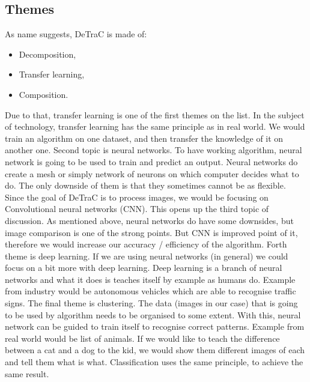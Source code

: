\subsection{Themes}
As name suggests, DeTraC is made of:
\begin{itemize}
  \item Decomposition,
  \item Transfer learning,
  \item Composition.
\end{itemize}

Due to that, transfer learning is one of the first themes on the list. In the subject of technology, transfer learning has the same principle as in real world. We would train an algorithm on one dataset, and then transfer the knowledge of it on another one.
Second topic is neural networks. To have working algorithm, neural network is going to be used to train and predict an output. Neural networks do create a mesh or simply network of neurons on which computer decides what to do. The only downside of them is that they sometimes cannot be as flexible.
\newline
Since the goal of DeTraC is to process images, we would be focusing on Convolutional neural networks (CNN). This opens up the third topic of discussion. As mentioned above, neural networks do have some downsides, but image comparison is one of the strong points. But CNN is improved point of it, therefore we would increase our accuracy / efficiency of the algorithm.
\newline
Forth theme is deep learning. If we are using neural networks (in general) we could focus on a bit more with deep learning. Deep learning is a branch of neural networks and what it does is teaches itself by example as humans do. Example from industry would be autonomous vehicles which are able to recognise traffic signs.
\newline
The final theme is clustering. The data (images in our case) that is going to be used by algorithm needs to be organised to some extent. With this, neural network can be guided to train itself to recognise correct patterns. Example from real world would be list of animals. If we would like to teach the difference between a cat and a dog to the kid, we would show them different images of each and tell them what is what. Classification uses the same principle, to achieve the same result.
